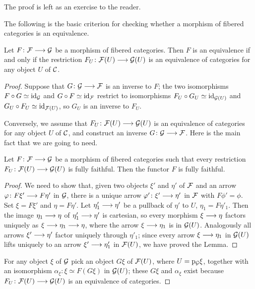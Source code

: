 \begin{3   FIBERED CATEGORIES}
\begin{3.5 Equivalences of fibered categories}
The proof is left as an exercise to the reader.

The following is the basic criterion for checking whether a morphism of fibered categories is an equivalence.

\begin{proposition}\label{prop:char-equivalence} Let $F \colon \cF \arr \cG$ be a morphism of fibered categories. Then $F$ is an equivalence if and only if the restriction $F_U \colon \cF(U) \arr \cG(U)$ is an equivalence of categories for any object $U$ of $\mathcal{C}$.
\end{proposition}

\begin{proof} Suppose that $G \colon \cG \arr \cF$ is an inverse to $F$; the two isomorphisms $F \circ G\simeq \mathrm{id}_{\mathcal{G}}$ and $G \circ F\simeq \mathrm{id}_{\mathcal{F}}$  restrict to isomorphisms $F_U \circ G_U\simeq \mathrm{id}_{\mathcal{G}(U)}$ and $G_U \circ F_U\simeq \mathrm{id}_{\mathcal{F}(U)}$, so $G_U$ is an inverse to $F_U$.

Conversely, we assume that $F_U \colon \cF(U) \arr \cG(U)$ is an equivalence of categories for any object $U$ of $\mathcal{C}$, and construct an inverse $G \colon \cG \arr \cF$. Here is the main fact that we are going to need.

\begin{lemma}\label{lem:fully-fibered} Let $F \colon \cF \arr \cG$ be a morphism of fibered categories such that every restriction $F_U \colon \cF(U) \arr \cG(U)$ is fully faithful. Then the functor $F$ is fully faithful.
\end{lemma}

\begin{proof} We need to show that, given two objects $\xi'$ and $\eta'$ of $\mathcal{F}$ and an arrow $\phi \colon F \xi' \arr F \eta'$ in $\mathcal{G}$, there is a unique arrow $\phi' \colon \xi' \arr \eta'$ in $\mathcal{F}$ with $F \phi' = \phi$. Set $\xi = F \xi'$ and $\eta = F \eta'$. Let $\eta'_1 \arr \eta'$ be a pullback of $\eta'$ to $U$, $\eta_1 = F \eta'_1$. Then the image $\eta_1 \arr \eta$ of $\eta_1' \arr \eta'$ is cartesian, so every morphism $\xi \arr \eta$ factors uniquely as $\xi \arr \eta_1 \arr \eta$, where the arrow $\xi \arr \eta_1$ is in $\mathcal{G}(U)$. Analogously all arrows $\xi' \arr \eta'$ factor uniquely through $\eta'_1$; since every arrow $\xi \arr \eta_1$ in $\mathcal{G}(U)$ lifts uniquely to an arrow $\xi' \arr \eta'_1$ in $\mathcal{F}(U)$, we have proved the Lemma.
\end{proof}

For any object $\xi$ of $\mathcal{G}$ pick an object $G \xi$ of $\mathcal{F}(U)$, where $U = \mathrm{p}_{\mathcal{G}} \xi$, together with an isomorphism $\alpha_\xi \colon \xi \simeq F(G \xi)$ in $\mathcal{G}(U)$; these $G \xi$ and $\alpha_\xi$ exist because $F_U \colon \cF(U) \arr \cG(U)$ is an equivalence of categories. 


\end{proof}
\end{3.5 Equivalences of fibered categories}
\end{3   FIBERED CATEGORIES}
